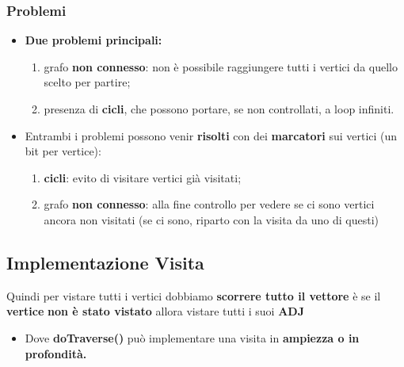 \subsubsection{Problemi}
\begin{itemize}
    \item \textbf{Due problemi principali:}
    \begin{enumerate}
        \item grafo \textbf{non connesso}: non è possibile raggiungere tutti i
        vertici da quello scelto per partire;
        \item presenza di \textbf{cicli}, che possono portare, se non controllati, a
        loop infiniti.
    \end{enumerate}

    \item  Entrambi i problemi possono venir \textbf{risolti} con dei \textbf{marcatori}
    sui vertici (un bit per vertice):
    \begin{enumerate}
        \item  \textbf{cicli}: evito di visitare vertici già visitati;
        \item  grafo \textbf{non connesso}: alla fine controllo per vedere se ci
        sono vertici ancora non visitati (se ci sono, riparto con la
        visita da uno di questi)
    \end{enumerate}

\end{itemize}

\subsection{Implementazione Visita}
Quindi per vistare tutti i vertici dobbiamo \textbf{scorrere tutto il vettore} è se il \textbf{vertice} \textbf{non è stato vistato} allora vistare tutti i suoi \textbf{ADJ}\newline
\begin{tcolorbox}[width=14cm, boxsep=10pt]
    
    \begin{itemize}
        \item Dove \textbf{doTraverse()} può implementare una visita in \textbf{ampiezza o
        in profondità.}
    \end{itemize}
\end{tcolorbox}

